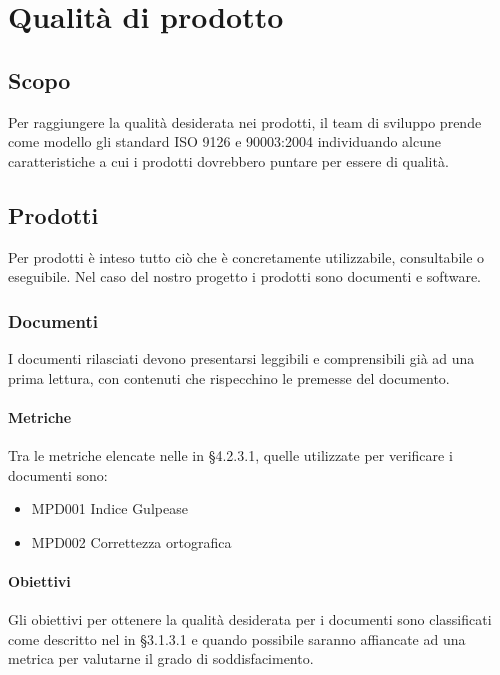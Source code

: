 \section{Qualità di prodotto}

\subsection{Scopo}
Per raggiungere la qualità desiderata nei prodotti, il team di sviluppo prende come modello gli standard ISO 9126 e 90003:2004 individuando alcune caratteristiche a cui i prodotti dovrebbero puntare per essere di qualità.


\subsection{Prodotti} %
Per prodotti è inteso tutto ciò che è concretamente utilizzabile, consultabile o eseguibile. Nel caso del nostro progetto i prodotti sono documenti e software.
	\subsubsection{Documenti}
	I documenti rilasciati devono presentarsi leggibili e comprensibili già ad una prima lettura, con contenuti che rispecchino le premesse del documento.

		\paragraph{Metriche}
		Tra le metriche elencate nelle \NdPv in  §4.2.3.1, quelle utilizzate per verificare i documenti sono:
		
		\begin{itemize}
			\item MPD001 Indice Gulpease
			\item MPD002 Correttezza ortografica
		\end{itemize} 
		
		\paragraph{Obiettivi}
		Gli obiettivi per ottenere la qualità desiderata per i documenti sono classificati come descritto nel \NdP in §3.1.3.1 e quando possibile saranno affiancate ad una metrica per valutarne il grado di soddisfacimento.
		
